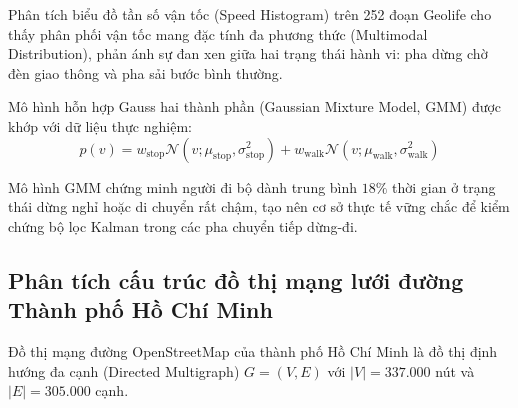 \hspace{0.5cm} Phân tích biểu đồ tần số vận tốc (Speed Histogram) trên 252 đoạn Geolife cho thấy phân phối vận tốc mang đặc tính đa phương thức (Multimodal Distribution), phản ánh sự đan xen giữa hai trạng thái hành vi: pha dừng chờ đèn giao thông và pha sải bước bình thường.

Mô hình hỗn hợp Gauss hai thành phần (Gaussian Mixture Model, GMM) được khớp với dữ liệu thực nghiệm:
\begin{equation}
p(v) = w_{\text{stop}} \mathcal{N}(v; \mu_{\text{stop}}, \sigma_{\text{stop}}^2) + w_{\text{walk}} \mathcal{N}(v; \mu_{\text{walk}}, \sigma_{\text{walk}}^2)
\label{eq:gmm-velocity-distribution}
\end{equation}

\begin{table}[H]
\centering
\caption{Các tham số ước lượng của mô hình hỗn hợp Gauss (GMM) trên tập dữ liệu Geolife}
\label{tab:gmm-parameters-table}
\end{table}

Mô hình GMM chứng minh người đi bộ dành trung bình $18\%$ thời gian ở trạng thái dừng nghỉ hoặc di chuyển rất chậm, tạo nên cơ sở thực tế vững chắc để kiểm chứng bộ lọc Kalman trong các pha chuyển tiếp dừng-đi.

\subsection{Phân tích cấu trúc đồ thị mạng lưới đường Thành phố Hồ Chí Minh}

\hspace{0.5cm} Đồ thị mạng đường OpenStreetMap của thành phố Hồ Chí Minh là đồ thị định hướng đa cạnh (Directed Multigraph) $G = (V, E)$ với $|V| = 337.000$ nút và $|E| = 305.000$ cạnh.

